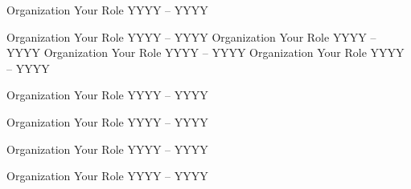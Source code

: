 

\begin{cvhonors}
  \cvhonor
    {Organization} %
    {Your Role} %
    {} %
    {YYYY -- YYYY} %
 
\end{cvhonors}
\pagebreak
{}
\begin{cvhonors}
      \cvhonor
    {Organization} %
    {Your Role} %
    {} %
    {YYYY -- YYYY} %
    \cvhonor
    {Organization} %
    {Your Role} %
    {} %
    {YYYY -- YYYY} %
  \cvhonor
    {Organization} %
    {Your Role} %
    {} %
    {YYYY -- YYYY} %
 \cvhonor
    {Organization} %
    {Your Role} %
    {} %
    {YYYY -- YYYY} %
    
\end{cvhonors}

\begin{cvhonors}
  \cvhonor
      {Organization} %
    {Your Role} %
    {} %
    {YYYY -- YYYY} %
    
  \cvhonor
    {Organization} %
    {Your Role} %
    {} %
    {YYYY -- YYYY} %

  \cvhonor
    {Organization} %
    {Your Role} %
    {} %
    {YYYY -- YYYY} %

   \cvhonor
    {Organization} %
    {Your Role} %
    {} %
    {YYYY -- YYYY} %

\end{cvhonors}

